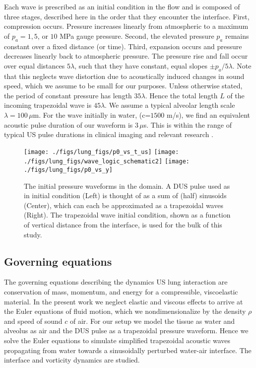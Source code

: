 Each wave is prescribed as an initial condition in the flow and is
composed of three stages, described here in the order that they
encounter the interface. First, compression occurs. Pressure increases
linearly from atmospheric to a maximum of $p_a=1, 5$, or $10$ MPa
gauge pressure. Second, the elevated pressure $p_a$ remains constant
over a fixed distance (or time). Third, expansion occurs and pressure
decreases linearly back to atmospheric pressure. The pressure rise and
fall occur over equal distances $5\lambda$, such that they have
constant, equal slopes $\pm p_{a}/5\lambda$. Note that this neglects
wave distortion due to acoustically induced changes in sound speed,
which we assume to be small for our purposes. Unless otherwise stated,
the period of constant pressure has length $35\lambda$. Hence the
total length $L$ of the incoming trapezoidal wave is $45\lambda$. We
assume a typical alveolar length scale $\lambda=100 \, \mu$m. For the
wave initially in water, (c=$1500$ m/s), we find an equivalent
acoustic pulse duration of our waveform is $3 \, \mu$s.  This is
within the range of typical \ac{US} pulse durations in clinical
imaging \citep{Edelman2005} and relevant research \citep{Obrien2006b}.
%
\begin{figure}%
  \centering%
  \texttt{[image: ./figs/lung\_figs/p0\_vs\_t\_us]}\hfill%
  \texttt{[image: ./figs/lung\_figs/wave\_logic\_schematic2]}\hfill
  \texttt{[image: ./figs/lung\_figs/p0\_vs\_y]}%
  \caption[Trapezoidal and \ac{DUS} pulse waves]{The initial pressure
    waveforms in the domain. A \ac{DUS} pulse used as in initial
    condition (Left) is thought of as a sum of (half) sinusoids
    (Center), which can each be approximated as a trapezoidal waves
    (Right). The trapezoidal wave initial condition, shown as a function of
    vertical distance from the interface, is used for the bulk of this
    study.}%
  \label{fig:p0}
\end{figure}
%
\subsection{Governing equations}
The governing equations describing the dynamics \ac{US} lung
interaction are conservation of mass, momentum, and energy for a
compressible, viscoelastic material. In the present work we neglect
elastic and viscous effects to arrive at the Euler equations of fluid
motion, which we nondimensionalize by the density $\rho$ and speed of
sound $c$ of air.  For our setup we model the tissue as water and
alveolus as air and the \ac{DUS} pulse as a trapezoidal pressure
waveform. Hence we solve the Euler equations to simulate simplified
trapezoidal acoustic waves propagating from water towards a
sinusoidally perturbed water-air interface. The interface and
vorticity dynamics are studied.

